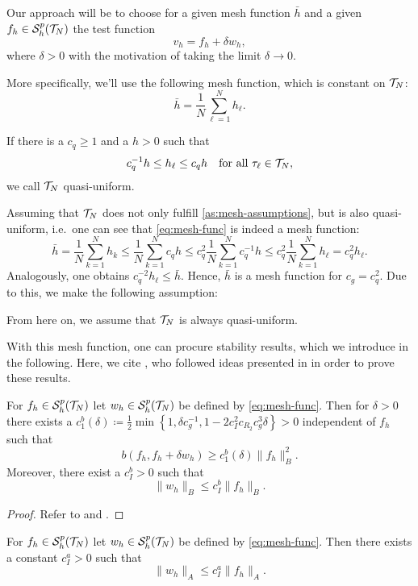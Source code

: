 \documentclass[../thesis.tex]{subfiles}
\begin{document}
Our approach will be to choose for a given mesh function $\bar{h}$ and a given $f_h \in \mathcal{S}_h^p(\mathcal{T}_N)$ the test function
\[
	v_h = f_h + \delta w_h,
\]
where $\delta > 0$ with the motivation of taking the limit $\delta \to 0$.

More specifically, we'll use the following mesh function, which is constant on $\mathcal{T}_N$:
\begin{equation}
\label{eq:mesh-func}
	\bar{h} = \frac{1}{N} \sum_{\ell = 1}^N h_\ell.
\end{equation}

\begin{definition}
If there is a $c_q \geq 1$ and a $h > 0$ such that
\[
	c_q^{-1} h \leq h_\ell \leq c_q h \quad \text{for all } \tau_\ell \in \mathcal{T}_N,
\]
we call $\mathcal{T}_N$ quasi-uniform.
\end{definition}
Assuming that $\mathcal{T}_N$ does not only fulfill \cref{as:mesh-assumptions}, but is also quasi-uniform, i.e.\ one can see that \cref{eq:mesh-func} is indeed a mesh function:
\[
	\bar{h} = \frac{1}{N} \sum_{k = 1}^N h_k \leq \frac{1}{N} \sum_{k=1}^N c_q h \leq c_q^2 \frac{1}{N} \sum_{k=1}^N c_q^{-1} h \leq c_q^2 \frac{1}{N} \sum_{k=1}^N h_\ell = c_q^2 h_\ell.
\]
Analogously, one obtains $c_q^{-2} h_\ell \leq \bar{h}$. Hence, $\bar{h}$ is a mesh function for $c_g = c_q^2$.
Due to this, we make the following assumption:
\begin{assumption}
\label{as:quasi-uniform}
From here on, we assume that $\mathcal{T}_N$ is always quasi-uniform.
\end{assumption}
With this mesh function, one can procure stability results, which we introduce in the following.
Here, we cite \cite{Neumueller}, who followed ideas presented in \cite{EggerSchoberl} in order to prove these results.
\begin{lemma}
\label{thm:wh-b-bound}
For $f_h \in \mathcal{S}_h^p(\mathcal{T}_N)$ let $w_h \in \mathcal{S}_h^p(\mathcal{T}_N)$ be defined by \cref{eq:mesh-func}.
Then for $\delta > 0$ there exists a $c_1^b(\delta) \coloneqq \frac{1}{2} \min \left\{ 1, \delta c_g^{-1}, 1 - 2 c_I^2 c_{R_2} c_g^3 \delta \right\} > 0$ independent of $f_h$ such that
\[
	b(f_h, f_h + \delta w_h) \geq c_1^b(\delta) \| f_h \|_B^2.
\]
Moreover, there exist a $c_I^b > 0$ such that
\[
	\| w_h \|_B \leq c_I^b \| f_h \|_B.
\]
\end{lemma}
\begin{proof}
Refer to \cite[Lemma 2.2.14]{Neumueller} and \cite[Lemma 2.2.15]{Neumueller}.
\end{proof}
\begin{lemma}
\label{thm:wh-A-bound}
For $f_h \in \mathcal{S}_h^p(\mathcal{T}_N)$ let $w_h \in \mathcal{S}_h^p(\mathcal{T}_N)$ be defined by \cref{eq:mesh-func}. Then there exists a constant $c_I^a > 0$ such that
\[
	\| w_h \|_A \leq c_I^a \| f_h \|_A.
\]
\end{lemma}
\end{document}
